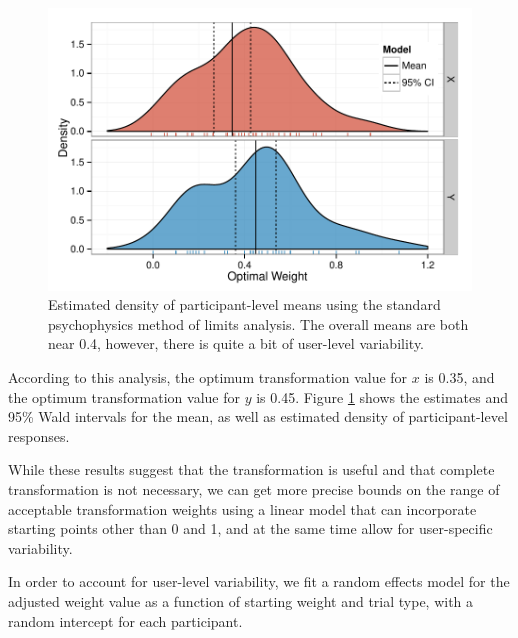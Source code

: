 \documentclass[11pt]{isuthesis}\usepackage[]{graphicx}\usepackage[]{color}
\newenvironment{knitrout}{}{} %
\begin{document}
\begin{figure}\centering
\begin{knitrout}
\color{fgcolor}

{\centering \includegraphics[width=.5\linewidth]{Figure/sineIllusion/fig-meanDists-1} 

}



\end{knitrout}
\caption[Results from psychophysics analysis]{Estimated density of participant-level means using the standard psychophysics method of limits analysis. The overall means are both near 0.4, however, there is quite a bit of user-level variability.\label{fig:psycho}}
\end{figure}



According to this analysis, the optimum transformation value for $x$ is 0.35, and the optimum transformation value for $y$ is 0.45. Figure \ref{fig:psycho} shows the estimates and 95\% Wald intervals for the mean, as well as estimated density of participant-level responses. 

While these results suggest that the transformation is useful and that complete transformation is not necessary, we can get more precise bounds on the range of acceptable transformation weights using a linear model that can incorporate starting points other than 0 and 1, and at the same time allow for user-specific variability.

In order to account for user-level variability, we fit a random effects model for the adjusted weight value as a function of  starting weight and trial type, with a random intercept for each participant. 
\end{document}
